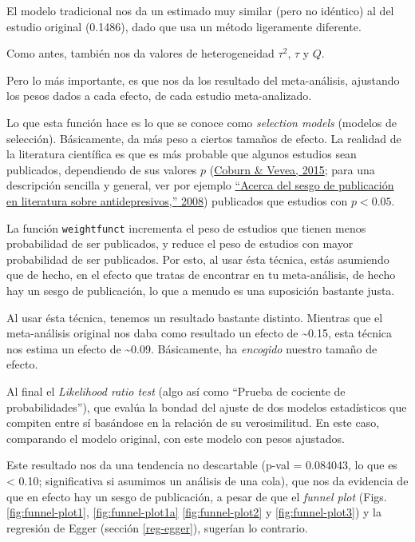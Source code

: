 \documentclass[
  bookmarksnumbered]{article}
\begin{document}
El modelo tradicional nos da un estimado muy similar (pero no idéntico) al del estudio original (0.1486), dado que usa un método ligeramente diferente.

Como antes, también nos da valores de heterogeneidad \(\tau^2\), \(\tau\) y \(Q\).

Pero lo más importante, es que nos da los resultado del meta-análisis, ajustando los pesos dados a cada efecto, de cada estudio meta-analizado.

Lo que esta función hace es lo que se conoce como \emph{selection models} (modelos de selección). Básicamente, da más peso a ciertos tamaños de efecto. La realidad de la literatura científica es que es más probable que algunos estudios sean publicados, dependiendo de sus valores \(p\) (\protect\hyperlink{ref-coburnPublicationBiasFunction2015}{Coburn \& Vevea, 2015}; para una descripción sencilla y general, ver por ejemplo \protect\hyperlink{ref-SesgoPublicacion2008}{{``{Acerca del sesgo de publicación en literatura sobre antidepresivos},''} 2008}) publicados que estudios con \(p < 0.05\).

La función \texttt{weightfunct} incrementa el peso de estudios que tienen menos probabilidad de ser publicados, y reduce el peso de estudios con mayor probabilidad de ser publicados. Por esto, al usar ésta técnica, estás asumiendo que de hecho, en el efecto que tratas de encontrar en tu meta-análisis, de hecho hay un sesgo de publicación, lo que a menudo es una suposición bastante justa.

Al usar ésta técnica, tenemos un resultado bastante distinto. Mientras que el meta-análisis original nos daba como resultado un efecto de \textasciitilde0.15, esta técnica nos estima un efecto de \textasciitilde0.09. Básicamente, ha \emph{encogido} nuestro tamaño de efecto.

Al final el \emph{Likelihood ratio test} (algo así como ``Prueba de cociente de probabilidades''), que evalúa la bondad del ajuste de dos modelos estadísticos que compiten entre sí basándose en la relación de su verosimilitud. En este caso, comparando el modelo original, con este modelo con pesos ajustados.

Este resultado nos da una tendencia no descartable (p-val = 0.084043, lo que es \textless{} 0.10; significativa si asumimos un análisis de una cola), que nos da evidencia de que en efecto hay un sesgo de publicación, a pesar de que el \emph{funnel plot} (Figs. \ref{fig:funnel-plot1}, \ref{fig:funnel-plot1a} \ref{fig:funnel-plot2} y \ref{fig:funnel-plot3}) y la regresión de Egger (sección \ref{reg-egger}), sugerían lo contrario.
\end{document}

